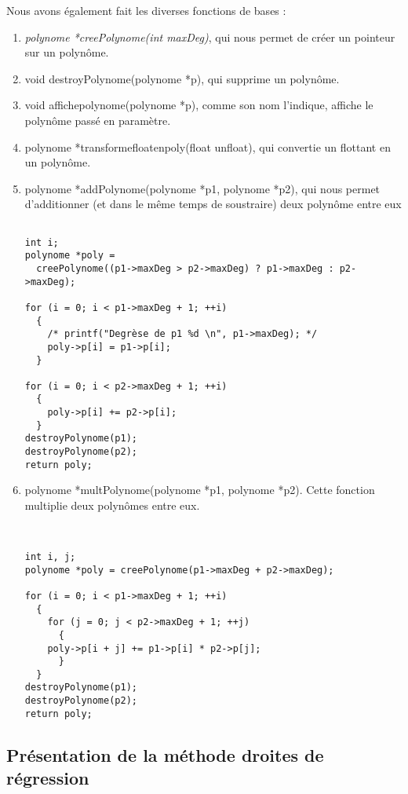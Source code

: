 \documentclass[letter]{article}
\begin{document}
Nous avons également fait les diverses fonctions de bases :
\begin{enumerate}
\item \emph{polynome *creePolynome(int maxDeg)}, qui nous permet de créer un pointeur sur un polynôme.
\item void destroyPolynome(polynome *p), qui supprime un polynôme.
\item void affichepolynome(polynome *p), comme son nom l'indique, affiche le polynôme passé en paramètre.
\item polynome *transformefloatenpoly(float unfloat), qui convertie un flottant en un polynôme.
\item polynome *addPolynome(polynome *p1, polynome *p2), qui nous permet d'additionner (et dans le même temps de soustraire) deux polynôme entre eux

\begin{verbatim}

int i;
polynome *poly =
  creePolynome((p1->maxDeg > p2->maxDeg) ? p1->maxDeg : p2->maxDeg);

for (i = 0; i < p1->maxDeg + 1; ++i)
  {
    /* printf("Degrèse de p1 %d \n", p1->maxDeg); */
    poly->p[i] = p1->p[i];
  }

for (i = 0; i < p2->maxDeg + 1; ++i)
  {
    poly->p[i] += p2->p[i];
  }
destroyPolynome(p1);
destroyPolynome(p2);
return poly;

\end{verbatim}
\item polynome *multPolynome(polynome *p1, polynome *p2). Cette fonction multiplie deux polynômes entre eux.

\begin{verbatim}


int i, j;
polynome *poly = creePolynome(p1->maxDeg + p2->maxDeg);

for (i = 0; i < p1->maxDeg + 1; ++i)
  {
    for (j = 0; j < p2->maxDeg + 1; ++j)
      {
	poly->p[i + j] += p1->p[i] * p2->p[j];
      }
  }
destroyPolynome(p1);
destroyPolynome(p2);
return poly;

\end{verbatim}
\end{enumerate}








\subsection{Présentation de la méthode droites de régression}
\label{sec:org7c742f9}
\end{document}
